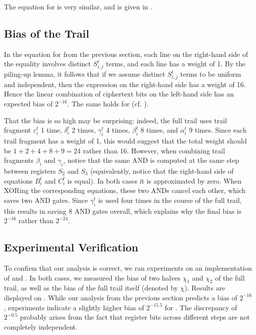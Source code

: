 \documentclass{llncs}
\begin{document}
The equation for  is very similar, and is given in .

\subsection{Bias of the Trail}
\label{sec:minibias}

In the equation for  from the previous section, each line on the right-hand side of the equality involves distinct $S^t_{i,j}$ terms, and each line has a weight of 1. By the piling-up lemma, it follows that if we assume distinct $S^t_{i,j}$ terms to be uniform and independent, then the expression on the right-hand side has a weight of 16. Hence the linear combination of ciphertext bits on the left-hand side has an expected bias of $2^{-16}$. The same holds for  (cf. ).

That the bias is so high may be surprising: indeed, the full trail uses trail fragment $\varepsilon^t_i$ 1 time, $\delta^t_i$ 2 times, $\gamma^t_i$ 4 times, $\beta^t_i$ 8 times, and $\alpha^t_i$ 9 times. Since each trail fragment has a weight of 1, this would suggest that the total weight should be $1+2+4+8+9 = 24$ rather than 16. However, when combining trail fragments $\beta_i$ and $\gamma_i$, notice that the same AND is computed at the same step between registers $S_2$ and $S_3$ (equivalently, notice that the right-hand side of equations $B^t_i$ and $C^t_i$ is equal). In both cases it is approximated by zero. When XORing the corresponding equations, these two ANDs cancel each other, which saves two AND gates. Since $\gamma^t_i$ is used four times in the course of the full trail, this results in saving 8 AND gates overall, which explains why the final bias is $2^{-16}$ rather than $2^{-24}$.

\subsection{Experimental Verification}

To confirm that our analysis is correct, we ran experiments on an implementation of  and . In both cases, we measured the bias of two halves $\chi_1$ and $\chi_2$ of the full trail, as well as the bias of the full trail itself (denoted by $\chi$). Results are displayed on .
While our analysis from the previous section predicts a bias of $2^{-16}$, experiments indicate a slightly higher bias of $2^{-15.5}$ for . The discrepancy of $2^{-0.5}$ probably arises from the fact that register bits across different steps are not completely independent.
\end{document}
